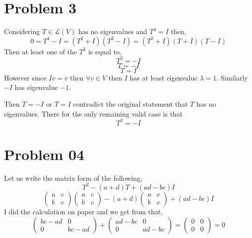 \documentclass[letter]{article}
\begin{document}
\section*{Problem 3}
Considering $T \in \mathcal L (V)$ has no eigenvalues and $T^{4} = I $ then,
\[
0 = T ^{4} - I = (T^2 + I) \left(T ^2 - I\right) = 
(T ^2 + I ) (T  + I ) (T - I )
\] Then at least one of the $T^2$ is equal to, 
\[
T^2 = - I 
\] 
\[
T = - I
\] 
\[
T = I 
\] 
However since $I v = v $ then $\forall v \in  V$ then $I$ has at least eigenvalue $\lambda = 1$. Similarly $-I$ has eigenvalue $- 1$. 

Then $T = - I$ or $T = I$ contradict the original statement that $T$ has no eigenvalues. There for the only remaining valid case is that
\[
T^2 = - I
\] 


\section*{Problem 04} 
Let us write the matrix form of the following,
\[
T ^2 - (a + d) T + (ad - bc) I 
\]
\[
	\begin{pmatrix} a & c \\ b & c \end{pmatrix} 
	\begin{pmatrix} a & c \\ b & c \end{pmatrix} 
- 
(a+d) 
	\begin{pmatrix} a & c \\ b & c \end{pmatrix} 
	+ (ad - bc) I 
\]
I did the calculation on paper and we get from that, 
\[
	\begin{pmatrix} bc -ad & 0 \\ 0 & bc -ad \end{pmatrix} + 
	\begin{pmatrix} ad -bc & 0 \\ 0 & ad -bc \end{pmatrix} = 
	\begin{pmatrix} 0 & 0 \\ 0 & 0  \end{pmatrix}  = 0 \] 
\end{document}
